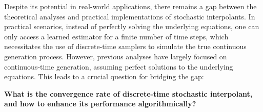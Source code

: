 
Despite its potential in real-world applications, there remains a gap between the theoretical analyses and practical implementations of stochastic interpolants. In practical scenarios, instead of perfectly solving the underlying equations, one can only access a learned estimator for a finite number of time steps, which necessitates the use of discrete-time samplers to simulate the true continuous generation process. However, previous analyses have largely focused on continuous-time generation, assuming perfect solutions to the underlying equations. This leads to a crucial question for bridging the gap:


\begin{center}
\textbf{What is the convergence rate of discrete-time stochastic interpolant, and how to enhance its performance algorithmically?}
\end{center}


